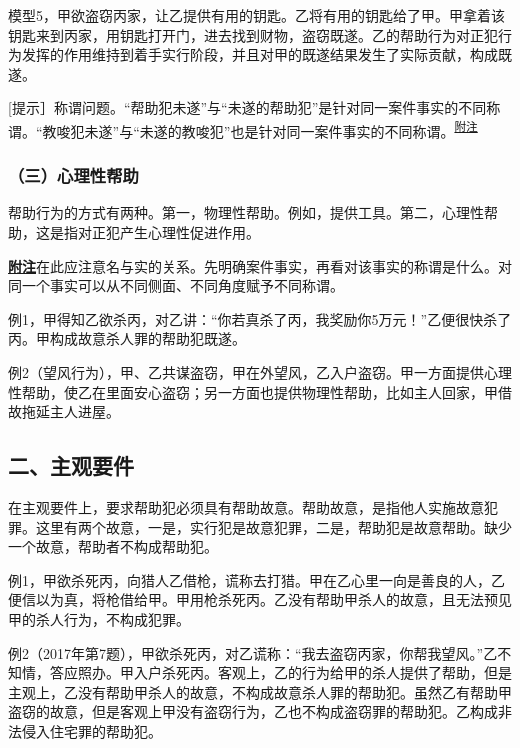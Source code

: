 模型5，甲欲盗窃丙家，让乙提供有用的钥匙。乙将有用的钥匙给了甲。甲拿着该钥匙来到丙家，用钥匙打开门，进去找到财物，盗窃既遂。乙的帮助行为对正犯行为发挥的作用维持到着手实行阶段，并且对甲的既遂结果发生了实际贡献，构成既遂。


[提示］称谓问题。“帮助犯未遂”与“未遂的帮助犯”是针对同一案件事实的不同称谓。“教唆犯未遂”与“未遂的教唆犯”也是针对同一案件事实的不同称谓。\hypertarget{extended-note-151-1-ref}{}\textsuperscript{\hyperlink{extended-note-151-1}{附注}}

\subsubsection*{（三）心理性帮助}

帮助行为的方式有两种。第一，物理性帮助。例如，提供工具。第二，心理性帮助，这是指对正犯产生心理性促进作用。

\par\noindent\hypertarget{extended-note-151-1}{\hyperlink{extended-note-151-1-ref}{\textbf{附注}}}\quad 在此应注意名与实的关系。先明确案件事实，再看对该事实的称谓是什么。对同一个事实可以从不同侧面、不同角度赋予不同称谓。


例1，甲得知乙欲杀丙，对乙讲：“你若真杀了丙，我奖励你5万元！”乙便很快杀了丙。甲构成故意杀人罪的帮助犯既遂。

例2（望风行为），甲、乙共谋盗窃，甲在外望风，乙入户盗窃。甲一方面提供心理性帮助，使乙在里面安心盗窃；另一方面也提供物理性帮助，比如主人回家，甲借故拖延主人进屋。


\subsection*{二、主观要件}

在主观要件上，要求帮助犯必须具有帮助故意。帮助故意，是指他人实施故意犯罪。这里有两个故意，一是，实行犯是故意犯罪，二是，帮助犯是故意帮助。缺少一个故意，帮助者不构成帮助犯。

例1，甲欲杀死丙，向猎人乙借枪，谎称去打猎。甲在乙心里一向是善良的人，乙便信以为真，将枪借给甲。甲用枪杀死丙。乙没有帮助甲杀人的故意，且无法预见甲的杀人行为，不构成犯罪。

例2（2017年第7题），甲欲杀死丙，对乙谎称：“我去盗窃丙家，你帮我望风。”乙不知情，答应照办。甲入户杀死丙。客观上，乙的行为给甲的杀人提供了帮助，但是主观上，乙没有帮助甲杀人的故意，不构成故意杀人罪的帮助犯。虽然乙有帮助甲盗窃的故意，但是客观上甲没有盗窃行为，乙也不构成盗窃罪的帮助犯。乙构成非法侵入住宅罪的帮助犯。

